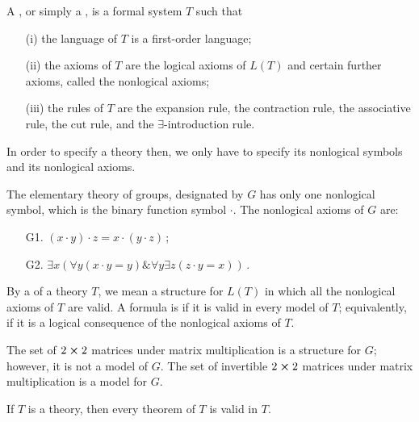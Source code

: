 \begin{shaded*}
    A , or simply a , is a formal system $T$ such that
    \begin{enumerate}
        \item[(i)] the language of $T$ is a first-order language;
        \item[(ii)] the axioms of $T$ are the logical axioms of $L(T)$ and certain further axioms, called the nonlogical axioms;
        \item[(iii)] the rules of $T$ are the expansion rule, the contraction rule, the associative rule, the cut rule, and the $\exists$-introduction rule.
    \end{enumerate}
\end{shaded*}

\begin{remark}
    In order to specify a theory then, we only have to specify its nonlogical symbols and its nonlogical axioms.
\end{remark}

\begin{example}
    The elementary theory of groups, designated by $G$ has only one nonlogical symbol, which is the binary function symbol $\cdot$.
    The nonlogical axioms of $G$ are:
    \begin{itemize}
        \item[G1.] $(x \cdot y) \cdot z = x \cdot (y \cdot z)$\,;
        \item[G2.] $\exists x (\forall y (x \cdot y = y) \& \forall y \exists z (z \cdot y = x))$\,.
    \end{itemize}
\end{example}

By a  of a theory $T$, we mean a structure for $L(T)$ in which all the nonlogical axioms of $T$ are valid.
A formula is  if it is valid in every model of $T$;
equivalently, if it is a logical consequence of the nonlogical axioms of $T$.

\begin{example}
    The set of $2 \cross 2$ matrices under matrix multiplication is a structure for $G$;
    however, it is not a model of $G$.
    The set of invertible $2 \cross 2$ matrices under matrix multiplication is a model for $G$.
\end{example}

\begin{theorem}\label{validity theorem}
    If $T$ is a theory, then every theorem of $T$ is valid in $T$.
\end{theorem}

